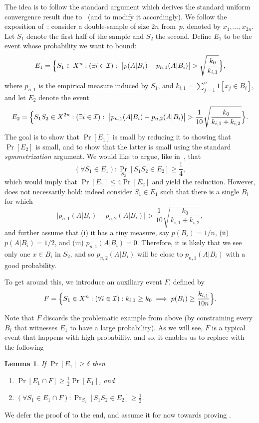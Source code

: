 \documentclass{article}
\newtheorem{lemma}[theorem]{Lemma}
\newcommand{\I}{\mathcal{I}}
\begin{document}
The idea is to follow the standard argument which derives the standard uniform convergence
result due to~\cite{vapnik} (and to modify it accordingly). 
We follow the exposition of~\cite{anthony}:
consider a double-sample of size $2n$ from~$p$, denoted by $x_1,\ldots,x_{2n}$.
Let $S_1$ denote the first half of the sample and $S_2$ the second.
Define $E_1$ to be the event whose probability we want to bound:
\[E_1 = \Bigl\{ S_1\in X^n : (\exists i\in \I):~ 
\bigl\lvert p(A \vert B_i) - p_{n,1}(A \vert B_i) \bigr\rvert > 
\sqrt{\frac{k_0}{k_{i,1}}} \Bigr\},\]
where $p_{n,1}$ is the empirical measure induced by $S_1$, 
and $k_{i,1}=\sum_{j=1}^n 1[x_j\in B_i]$, 
and let $E_2$ denote the event
\[E_2 = 
\Bigl\{
S_1S_2\in X^{2n} : (\exists i\in\I):~
\bigl\lvert p_{n,1}(A \vert B_i)   -  p_{n,2}(A \vert B_i) \bigr\rvert >  
\frac{1}{10}\sqrt{\frac{k_0}{k_{i,1}+k_{i,2}}}
\Bigr\}.
\]
The goal is to show that $\Pr[E_1]$ is small by reducing it to showing that $\Pr[E_2]$ 
is small, and to show that the latter is small using the standard \emph{symmetrization} argument. 
We would like to argue, like in~\cite{anthony}, that
\begin{equation}\label{eq:anthony} 
(\forall S_1\in E_1): \Pr_{S_2}[S_1S_2\in E_2]\geq \frac{1}{4},
\end{equation}
which would imply that $\Pr[E_1]\leq 4\Pr[E_2]$ and yield the reduction.
However,  does not necessarily hold: indeed consider
$S_1\in E_1$ such that there is a single $B_i$ for which 
\[\bigl\lvert p_{n,1}(A \vert B_i)   -  p_{n,2}(A \vert B_i) \bigr\rvert >  
\frac{1}{10}\sqrt{\frac{k_0}{k_{i,1}+k_{i,2}}},\]
and further assume that 
(i) it has a tiny measure, say $p(B_i) = 1/n$,
(ii) $p(A\vert B_i)= 1/2$, and
(iii) $p_{n,1}(A\vert B_i) = 0$.
Therefore, it is likely that we see only one $x\in B_i$ in $S_2$,
and so $p_{n,2}(A \vert B_i)$ will be close to $p_{n,1}(A \vert B_i)$ with a good probability.

To get around this, we introduce an auxiliary event $F$, defined by
\[F = \Bigl\{S_1\in X^{n} : (\forall i\in\I): k_{i,1} \geq k_0 \implies p(B_i)\geq \frac{k_{i,1}}{10n}\Bigr\}. \]

Note that $F$ discards the problematic example from above 
(by constraining every $B_i$ that witnesses $E_1$ to have a large probability). 
As we will see, $F$ is a typical event that happens with high probability,
and so, it enables us to replace  with the following
\begin{lemma}\label{lem:reduction}
If $\Pr[E_1]\geq \delta$ then 
\begin{enumerate}
\item $\Pr[E_1\cap F] \geq \frac{1}{2}\Pr[E_1]$, and
\item $(\forall S_1\in E_1\cap F): \Pr_{S_2}[S_1S_2\in E_2] \geq \frac{1}{2}$. 
\end{enumerate}
\end{lemma}
We defer the proof of  to the end, 
and assume it for now towards proving .
\end{document}

